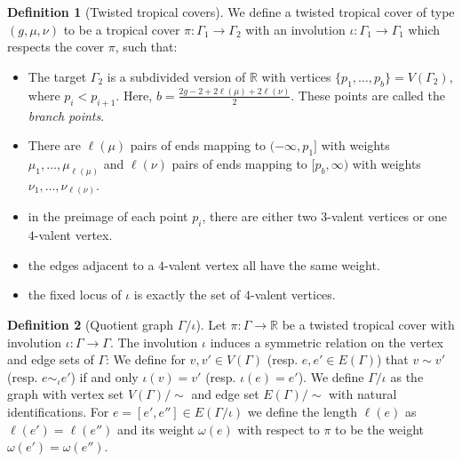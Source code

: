 \documentclass[10pt]{amsart}
\theoremstyle{plain}
\theoremstyle{definition}
\newtheorem{defi}[defi]{Definition}
\theoremstyle{definition}
\theoremstyle{plain}
\theoremstyle{plain}
\theoremstyle{remark}
\theoremstyle{plain}
\theoremstyle{plain}
\begin{document}
\begin{defi}[Twisted tropical covers]\label{def-twistedtropcover}
We define a twisted tropical cover of type $(g,\mu,\nu)$ to be a tropical cover $\pi\colon\Gamma_1\to\Gamma_2$ with an involution $\iota\colon\Gamma_1\to\Gamma_1$ which respects the cover $\pi$, such that:
\begin{itemize}
    \item The target $\Gamma_2$ is a subdivided version of $\mathbb{R}$ with vertices $\{p_1,\dots,p_b\}=V(\Gamma_2)$, where $p_i<p_{i+1}$. Here, $b=\frac{2g-2+2\ell(\mu)+2\ell(\nu)}{2}$. These points are called the \emph{branch points}.
    \item There are $\ell(\mu)$ pairs of ends mapping to $(-\infty,p_1]$ with weights $\mu_1,\dots,\mu_{\ell(\mu)}$ and $\ell(\nu)$ pairs of ends mapping to $[p_b,\infty)$ with weights $\nu_1,\ldots,\nu_{\ell(\nu)}$.
    \item in the preimage of each point $p_i$, there are either two $3$-valent vertices or one $4$-valent vertex.
    \item the edges adjacent to a $4$-valent vertex all have the same weight.
    \item the fixed locus of $\iota$ is exactly the set of $4$-valent vertices.
\end{itemize}
\end{defi}

\begin{defi}[Quotient graph $\Gamma/\iota$]
Let $\pi\colon \Gamma\to \mathbb{R}$ be a twisted tropical cover with involution $\iota\colon\Gamma\to\Gamma$. The involution $\iota$ induces a symmetric relation on the vertex and edge sets of $\Gamma$: We define for $v,v'\in V(\Gamma)$  (resp. $e,e'\in E(\Gamma)$) that $v\sim v'$ (resp. $e\sim_\iota e'$) if and only $\iota(v)=v'$ (resp. $\iota(e)=e'$). We define $\Gamma/\iota$ as the graph with vertex set $V(\Gamma)/\sim$ and edge set $E(\Gamma)/\sim$ with natural identifications. For $e=[e',e'']\in E(\Gamma/\iota)$ we define the length $\ell(e)$ as $\ell(e')=\ell(e'')$ and its weight $\omega(e)$ with respect to $\pi$ to be the weight $\omega(e')=\omega(e'')$.
\end{defi}
\end{document}
